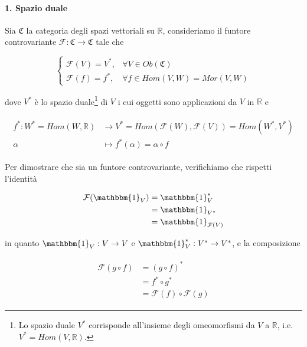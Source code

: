 \paragraph{1. Spazio duale}

Sia $ \mathfrak{C} $ la categoria degli spazi vettoriali su $ \mathbb{R} $, consideriamo il funtore controvariante $ \mathcal{F} : \mathfrak{C} \to \mathfrak{C} $ tale che

\begin{equation}
	\begin{cases}
		\mathcal{F}(V) = V^{*}, & \forall V \in Ob(\mathfrak{C})\\
		\mathcal{F}(f) = f^{*}, & \forall f \in Hom(V,W) = Mor(V,W)
	\end{cases}
\end{equation}

dove $ V^{*} $ è lo spazio duale\footnote{%
	Lo spazio duale $ V^{*} $ corrisponde all'insieme degli omeomorfismi da $ V $ a $ \mathbb{R} $, i.e. $ V^{*} = Hom(V,\mathbb{R}) $.%
} di $ V $ i cui oggetti sono applicazioni da $ V $ in $ \mathbb{R} $ e

\begin{align}
	\begin{split}
		f^{*} : W^{*} = Hom(W,\mathbb{R}) &\to V^{*} = Hom(\mathcal{F}(W),\mathcal{F}(V)) = Hom(W^{*},V^{*})\\
		\alpha &\mapsto f^{*}(\alpha) = \alpha \circ f
	\end{split}
\end{align}

Per dimostrare che sia un funtore controvariante, verifichiamo che rispetti l'identità

\begin{align}
	\begin{split}
		\mathcal{F}(\mathbbm{1}_{V}) &= \mathbbm{1}_{V}^{*}\\
		&= \mathbbm{1}_{V^{*}}\\
		&= \mathbbm{1}_{\mathcal{F}(V)}
	\end{split}
\end{align}

in quanto $ \mathbbm{1}_{V} : V \to V $ e $ \mathbbm{1}_{V}^{*} : V^{*} \to V^{*} $, e la composizione

\begin{align}
	\begin{split}
		\mathcal{F}(g \circ f) &= (g \circ f)^{*}\\
		&= f^{*} \circ g^{*}\\
		&= \mathcal{F}(f) \circ \mathcal{F}(g)
	\end{split}
\end{align}

